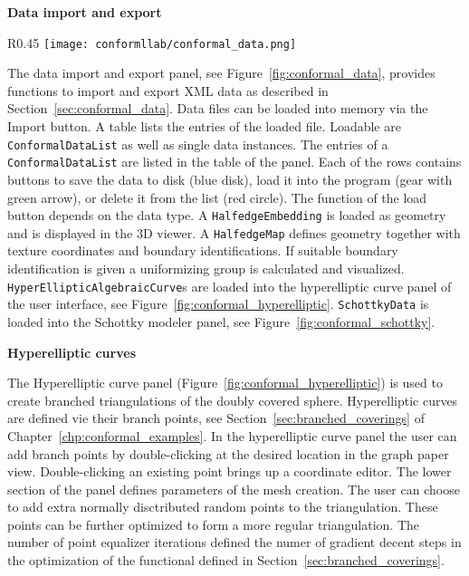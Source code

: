 \documentclass[Thesis.tex]{subfiles}
\begin{document}
{\bf Data import and export}

\begin{wrapfigure}{R}{0.45\textwidth}
\centering
\texttt{[image: conformllab/conformal\_data.png]}
\caption{XML data import and export interface of {\sc ConformalLab}.}
\label{fig:conformal_data}
\end{wrapfigure}
The data import and export panel, see Figure~\ref{fig:conformal_data},
provides functions to import and export XML data as described in Section~\ref{sec:conformal_data}.
Data files can be loaded into memory via the Import button. A table lists the entries of the loaded file.
Loadable are {\tt ConformalDataList} as well as single data instances. The entries of a
{\tt ConformalDataList} are listed in the table of the panel. Each of the rows contains buttons
to save the data to disk (blue disk), load it into the program (gear with green arrow), or delete 
it from the list (red circle).
The function of the load button depends on the data type. A {\tt HalfedgeEmbedding} is
loaded as geometry and is displayed in the 3D viewer. A {\tt HalfedgeMap} defines geometry 
together with texture coordinates and boundary identifications. If suitable boundary identification is given a uniformizing
group is calculated and visualized. {\tt HyperEllipticAlgebraicCurve}s are loaded into 
the hyperelliptic curve panel of the user interface, see Figure~\ref{fig:conformal_hyperelliptic}. 
{\tt SchottkyData} is loaded into the Schottky modeler panel, see Figure~\ref{fig:conformal_schottky}.

{\bf Hyperelliptic curves}

The Hyperelliptic curve panel (Figure~\ref{fig:conformal_hyperelliptic}) is used to create branched 
triangulations of the doubly covered sphere.
Hyperelliptic curves are defined vie their branch points, see Section~\ref{sec:branched_coverings} of Chapter~\ref{chp:conformal_examples}.
In the hyperelliptic curve panel the user can add branch points by double-clicking at the desired location in
the graph paper view. Double-clicking an existing point brings up a coordinate editor. The lower section
of the panel defines parameters of the mesh creation. The user can choose to add extra normally disctributed random points to the triangulation. These points can be further optimized to form a more regular triangulation.
The number of point equalizer iterations defined the numer of gradient decent steps in the optimization of 
the functional defined in Section~\ref{sec:branched_coverings}.
\end{document}
